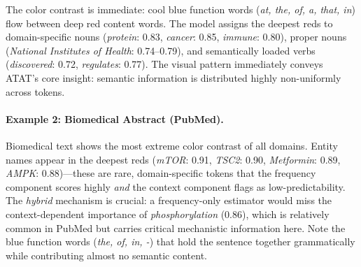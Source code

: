 \vspace{4pt}
\noindent
{}
\vspace{4pt}

\noindent The color contrast is immediate: cool blue function words (\emph{at, the, of, a, that, in}) flow between deep red content words. The model assigns the deepest reds to domain-specific nouns (\emph{protein}: 0.83, \emph{cancer}: 0.85, \emph{immune}: 0.80), proper nouns (\emph{National Institutes of Health}: 0.74--0.79), and semantically loaded verbs (\emph{discovered}: 0.72, \emph{regulates}: 0.77). The visual pattern immediately conveys ATAT's core insight: semantic information is distributed highly non-uniformly across tokens.

\paragraph{Example 2: Biomedical Abstract (PubMed).}

\vspace{4pt}
\noindent
{}
\vspace{4pt}

\noindent Biomedical text shows the most extreme color contrast of all domains. Entity names appear in the deepest reds (\emph{mTOR}: 0.91, \emph{TSC2}: 0.90, \emph{Metformin}: 0.89, \emph{AMPK}: 0.88)---these are rare, domain-specific tokens that the frequency component scores highly \emph{and} the context component flags as low-predictability. The \emph{hybrid} mechanism is crucial: a frequency-only estimator would miss the context-dependent importance of \emph{phosphorylation} (0.86), which is relatively common in PubMed but carries critical mechanistic information here. Note the blue function words (\emph{the, of, in, -}) that hold the sentence together grammatically while contributing almost no semantic content.


